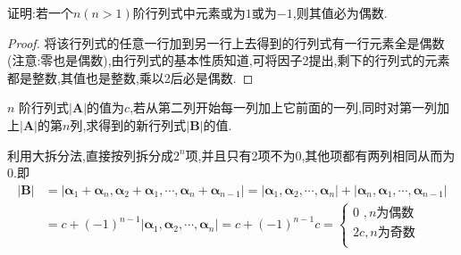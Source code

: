 \documentclass[../../main.tex]{subfiles}%
\begin{document}
\begin{example}
证明:若一个\(n(n>1)\)阶行列式中元素或为\(1\)或为\(-1\),则其值必为偶数.
\end{example}
\begin{proof}

将该行列式的任意一行加到另一行上去得到的行列式有一行元素全是偶数(注意:零也是偶数),由行列式的基本性质知道,可将因子2提出,剩下的行列式的元素都是整数,其值也是整数,乘以2后必是偶数.

\end{proof}

\begin{example}
\(n\) 阶行列式\(\vert \boldsymbol{A}\vert\)的值为\(c\),若从第二列开始每一列加上它前面的一列,同时对第一列加上\(\vert \boldsymbol{A}\vert\)的第\(n\)列,求得到的新行列式\(\vert \boldsymbol{B}\vert\)的值.
\end{example}
\begin{solution}

利用大拆分法,直接按列拆分成$2^n$项,并且只有2项不为0,其他项都有两列相同从而为0.即
\begin{align*}
\left| \boldsymbol{B} \right|&=\left| \boldsymbol{\alpha }_1+\boldsymbol{\alpha }_n,\boldsymbol{\alpha }_2+\boldsymbol{\alpha }_1,\cdots ,\boldsymbol{\alpha }_n+\boldsymbol{\alpha }_{n-1} \right|
=\left| \boldsymbol{\alpha }_1,\boldsymbol{\alpha }_2,\cdots ,\boldsymbol{\alpha }_n \right|+\left| \boldsymbol{\alpha }_n,\boldsymbol{\alpha }_1,\cdots ,\boldsymbol{\alpha }_{n-1} \right|
\\
&=c+\left( -1 \right) ^{n-1}\left| \boldsymbol{\alpha }_1,\boldsymbol{\alpha }_2,\cdots ,\boldsymbol{\alpha }_n \right|
=c+\left( -1 \right) ^{n-1}c
=\begin{cases}
0 \,\,,n\text{为偶数}\\
2c,n\text{为奇数}\\
\end{cases}
\end{align*}

\end{solution}
\end{document}

